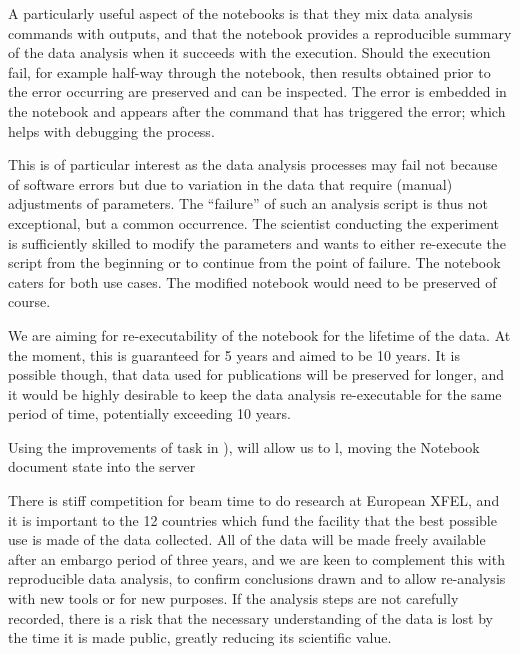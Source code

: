 \begin{task}[
  title=Reproducible X-ray crystallography workflows at European XFEL,
  id=reproducibility-euxfel,
  lead=XFEL,
  PM=36,
  wphases={6-48},
  partners={XFEL}
  ]
  A particularly useful aspect of the notebooks is that they mix data
  analysis commands with outputs, and that the notebook provides a
  reproducible summary of the data analysis when it succeeds with the
  execution. Should the execution fail, for example half-way through
  the notebook, then results obtained prior to the error occurring are
  preserved and can be inspected. The error is embedded in the
  notebook and appears after the command that has triggered the error;
  which helps with debugging the process.

  This is of particular interest as the data analysis processes may
  fail not because of software errors but due to variation in the data
  that require (manual) adjustments of parameters. The ``failure'' of
  such an analysis script is thus not exceptional, but a common
  occurrence. The scientist conducting the experiment is sufficiently
  skilled to modify the parameters and wants to either re-execute the
  script from the beginning or to continue from the point of
  failure. The notebook caters for both use cases. The modified
  notebook would need to be preserved of course.

  We are aiming for re-executability of the notebook for the lifetime
  of the data. At the moment, this is guaranteed for 5 years and aimed
  to be 10 years. It is possible though, that data used for
  publications will be preserved for longer, and it would be highly
  desirable to keep the data analysis re-executable for the same
  period of time, potentially exceeding 10 years.







  Using the improvements of task
   in ), will allow us to l, moving
  the Notebook document state into the server




  There is stiff competition for beam time to do research at European XFEL,
  and it is important to the 12 countries 
  which fund the facility that the best possible use is made of the data collected.
  All of the data will be made freely available after an embargo period of
  three years, and we are keen to complement this with reproducible data
  analysis, to confirm conclusions drawn and to allow re-analysis with new
  tools or for new purposes. 
  If the analysis steps are not carefully recorded, there is a risk that the
  necessary understanding of the data is lost by the time it is made public,
  greatly reducing its scientific value.


\end{task}
